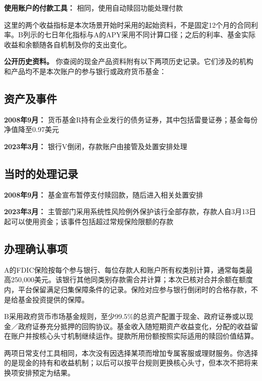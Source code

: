 \documentclass[UTF8,fontset=none,11pt,a4paper]{ctexart}
\begin{document}
\textbf{使用账户的付款工具：} 相同，使用自动赎回功能处理付款


这里的两个收益指标是本次场景开始时采用的起始资料，不是固定12个月的合同利率。B列示的七日年化指标与A的APY采用不同计算口径；之后的利率、基金实际收益和余额随各自机制及你的支出变化。


\textbf{公开历史资料。} 你查阅的现金产品资料附有以下两项历史记录。它们涉及的机构和产品均不是本次账户的参与银行或政府货币基金：


\subsection*{资产及事件}
\textbf{2008年9月：} 货币基金R持有企业发行的债务证券，其中包括雷曼证券；基金每份净值降至0.97美元


\textbf{2023年3月：} 银行V倒闭，存款账户由接管及处置安排处理


\subsection*{当时的处理记录}
\textbf{2008年9月：} 基金宣布暂停支付赎回款，随后进入相关处置安排


\textbf{2023年3月：} 主管部门采用系统性风险例外保护该行全部存款，存款人自3月13日起可以使用资金；该事件包括超过常规保险限额的存款


\subsection*{办理确认事项}
A的FDIC保险按每个参与银行、每位存款人和账户所有权类别计算，通常每类最高250,000美元。该银行其他同类别存款需合并计算；本次已核对合并余额在额度内，平台保留满足归集保障条件的记录。保险对应参与银行倒闭时的合格存款，不是给基金投资提供的保障。


B采用政府货币市场基金规则，至少99.5\%的总资产配置于现金、政府证券或以现金／政府证券充分抵押的回购协议。基金收入随短期资产收益变化，分配的收益留在账户并按核心头寸机制继续运作。提款所用份额按照实际适用的赎回价值结算。


两项日常支付工具相同，本次没有因选择某项而增加专属客服或理财服务。你选择的是现金的持有和收益机制；以后可以按平台规则更换核心头寸，但本次不把将来换项安排预定为结果。
\end{document}

